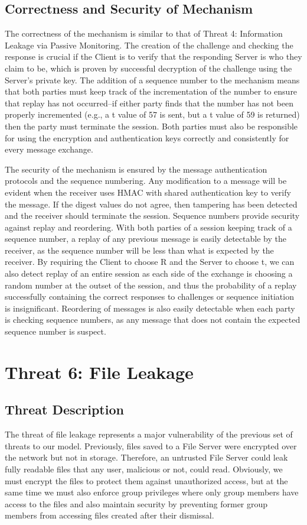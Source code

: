 \documentclass[11pt]{article}
\begin{document}
\subsection{Correctness and Security of Mechanism}
The correctness of the mechanism is similar to that of Threat 4: Information Leakage via Passive Monitoring. The creation of the challenge and checking the response is crucial if the Client is to verify that the responding Server is who they claim to be, which is proven by successful decryption of the challenge using the Server's private key. The addition of a sequence number to the mechanism means that both parties must keep track of the incrementation of the number to ensure that replay has not occurred--if either party finds that the number has not been properly incremented (e.g., a \textsf{t} value of 57 is sent, but a \textsf{t} value of 59 is returned) then the party must terminate the session. Both parties must also be responsible for using the encryption and authentication keys correctly and consistently for every message exchange.

The security of the mechanism is ensured by the message authentication protocols and the sequence numbering. Any modification to a message will be evident when the receiver uses HMAC with shared authentication key to verify the message. If the digest values do not agree, then tampering has been detected and the receiver should terminate the session. Sequence numbers provide security against replay and reordering. With both parties of a session keeping track of a sequence number, a replay of any previous message is easily detectable by the receiver, as the sequence number will be less than what is expected by the receiver. By requiring the Client to choose \textsf{R} and the Server to choose \textsf{t}, we can also detect replay of an entire session as each side of the exchange is choosing a random number at the outset of the session, and thus the probability of a replay successfully containing the correct responses to challenges or sequence initiation is insignificant. Reordering of messages is also easily detectable when each party is checking sequence numbers, as any message that does not contain the expected sequence number is suspect.
\section{Threat 6: File Leakage}
\subsection{Threat Description}
The threat of file leakage represents a major vulnerability of the previous set of threats to our model. Previously, files saved to a File Server were encrypted over the network but not in storage. Therefore, an untrusted File Server could leak fully readable files that any user, malicious or not, could read. Obviously, we must encrypt the files to protect them against unauthorized access, but at the same time we must also enforce group privileges where only group members have access to the files and also maintain security by preventing former group members from accessing files created after their dismissal.
\end{document}
